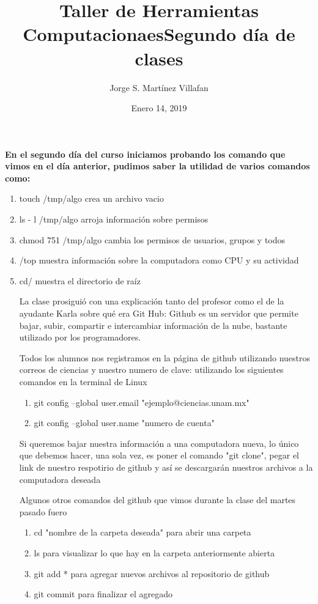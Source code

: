 \documentclass[letterpaper, 12pt, oneside]{article}%
\title{\Huge Taller de Herramientas Computacionaes}
\author{Jorge S. Martínez Villafan}
\date{Enero 14, 2019}
\begin{document}
\maketitle
\newpage
\title{Segundo día de clases}

\textbf{En el segundo día del curso iniciamos probando los comando que vimos en el día anterior, pudimos saber la utilidad  de varios comandos como:}


\begin{enumerate}
	\item touch /tmp/algo crea un archivo vacio
	\item ls - l /tmp/algo arroja información sobre permisos
	\item chmod 751 /tmp/algo cambia los permisos de usuarios, grupos y todos
	\item /top muestra información sobre la computadora como CPU y su actividad
	\item cd/ muestra el directorio de raíz
	
La clase prosiguió con una explicación tanto del profesor como el de la ayudante Karla sobre qué era Git Hub:
Github es un servidor que permite bajar, subir, compartir e intercambiar información de la nube, bastante utilizado por los programadores.

Todos los alumnos nos registramos en la página de github utilizando nuestros correos de ciencias y nuestro numero de clave: 
utilizando los siguientes comandos en la terminal de Linux

	
	\begin{enumerate}
		\item git config --global user.email "ejemplo@ciencias.unam.mx"
		\item git config --global user.name "numero de cuenta"

		\end{enumerate}
Si queremos bajar nuestra información a una computadora nueva, lo único que debemos hacer, una sola vez, es poner el comando "git clone", pegar el link de nuestro respotirio de github y así se descargarán nuestros archivos a la computadora deseada

Algunos otros comandos del github que vimos durante la clase del martes pasado fuero
	
	\begin{enumerate}
		\item cd "nombre de la carpeta deseada" para abrir una carpeta
		\item ls para visualizar lo que hay en la carpeta anteriormente abierta
		\item git add * para agregar nuevos archivos al repositorio de github
		\item git commit para finalizar el agregado
		 

\end{enumerate}
\end{enumerate}
\end{document}
